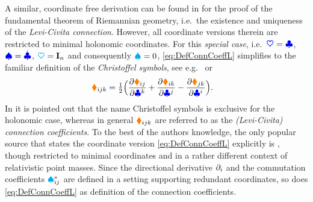 A similar, coordinate free derivation can be found in \cite[proof of Theorem 2.7.6]{Abraham:FoundationsOfMechanics} for the proof of the fundamental theorem of Riemannian geometry, i.e.\ the existence and uniqueness of the \textit{Levi-Civita connection}.
However, all coordinate versions therein are restricted to minimal holonomic coordinates.
For this \textit{special case}, i.e.\ $\sysCoord = \genCoord$, $\sysVel = \genCoordd$, $\kinMat=\idMat[\dimConfigSpace]$ and consequently $\BoltzSym{}{}{} = 0$, \eqref{eq:DefConnCoeffL} simplifies to the familiar definition of the \textit{Christoffel symbols}, see e.g.\ \cite[p.\,145]{Abraham:FoundationsOfMechanics} or \cite[Vol.\,2, p.\,221]{Spivak:DiffGeo}
\begin{align}
 \ConnCoeffL{\LidxI}{\LidxII}{\LidxIII} &= \tfrac{1}{2}\Big( \pdiff[\sysInertiaMatCoeff{\LidxI\LidxII}]{\genCoordCoeff{\LidxIII}} + \pdiff[\sysInertiaMatCoeff{\LidxI\LidxIII}]{\genCoordCoeff{\LidxII}} - \pdiff[\sysInertiaMatCoeff{\LidxII\LidxIII}]{\genCoordCoeff{\LidxI}} \Big).
\end{align}
In \cite[sec.\,9.2]{Frankel:GeometryOfPhysics} it is pointed out that the name Christoffel symbols is exclusive for the holonomic case, whereas in general $\ConnCoeffL{\LidxI}{\LidxII}{\LidxIII}$ are referred to as the \textit{(Levi-Civita) connection coefficients}.
To the best of the authors knowledge, the only popular source that states the coordinate version \eqref{eq:DefConnCoeffL} explicitly is \cite[eq.\ 8.24]{Misner:Gravitation}, though restricted to minimal coordinates and in a rather different context of relativistic point masses.
Since the directional derivative $\dirDiff{\LidxI}$ and the commutation coefficients $\BoltzSym{\LidxV}{\LidxI}{\LidxII}$ are defined in a setting supporting redundant coordinates, so does \eqref{eq:DefConnCoeffL} as definition of the connection coefficients.




